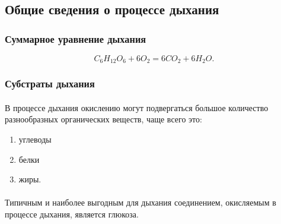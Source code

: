 
\subsection*{Общие сведения о процессе дыхания}


\subsubsection*{Суммарное уравнение дыхания}

\begin{equation}
	 C_{6}H_{12}O_{6} + 6O_{2} = 6CO_{2} + 6H_{2}O.
	 \label{braezing_balance}
\end{equation}



\subsubsection*{Субстраты дыхания}

\paragraph*{}В процессе дыхания окислению могут подвергаться большое количество разнообразных органических веществ, чаще всего это:

\begin{enumerate}

\item углеводы
\item белки 
\item жиры. 

\end{enumerate}

\paragraph*{}Типичным и наиболее выгодным для дыхания соединением, окисляемым в процессе дыхания, является глюкоза.  

